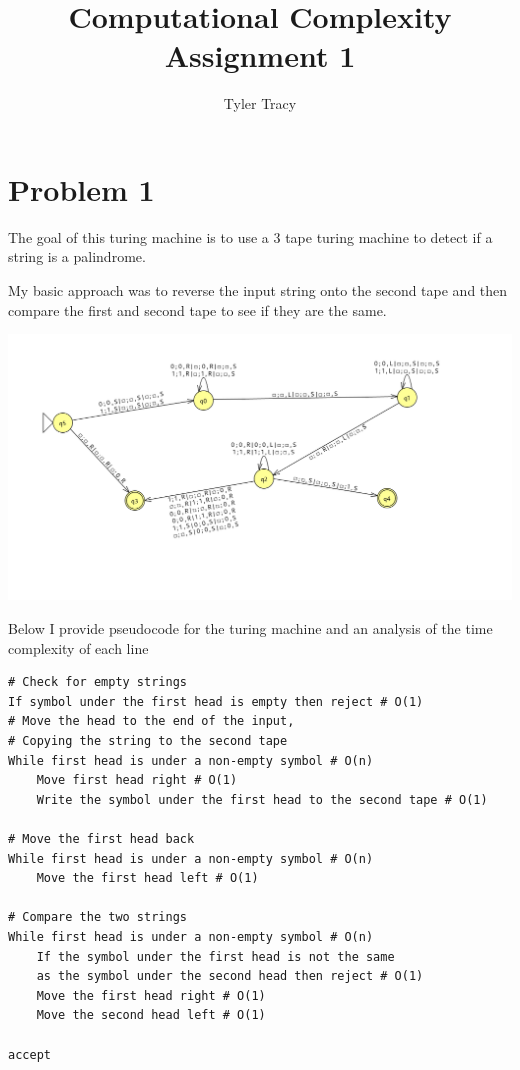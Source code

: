 \documentclass[12pt]{article}
\title{Computational Complexity Assignment 1}
\author{Tyler Tracy}
\begin{document}
\maketitle


\section{Problem 1}


The goal of this turing machine is to use a 3 tape turing machine to detect if a string is a palindrome.

My basic approach was to reverse the input string onto the second tape and then compare the first and second tape to see if they are the same.

\includegraphics[width=\textwidth]{problem1.png}

Below I provide pseudocode for the turing machine and an analysis of the time complexity of each line

\begin{lstlisting}[basicstyle=\small, tabsize=3]
# Check for empty strings
If symbol under the first head is empty then reject # O(1)
# Move the head to the end of the input,
# Copying the string to the second tape
While first head is under a non-empty symbol # O(n)
	Move first head right # O(1)
	Write the symbol under the first head to the second tape # O(1)

# Move the first head back
While first head is under a non-empty symbol # O(n)
	Move the first head left # O(1)

# Compare the two strings
While first head is under a non-empty symbol # O(n)
	If the symbol under the first head is not the same
	as the symbol under the second head then reject # O(1)
	Move the first head right # O(1)
	Move the second head left # O(1)

accept
\end{lstlisting}
\end{document}
